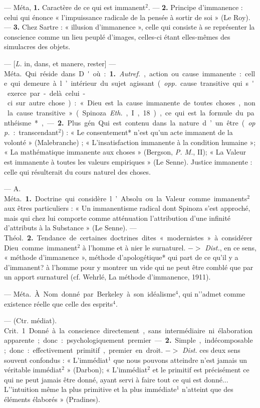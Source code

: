 \begin{itemize}[leftmargin=1cm, label=, itemsep=1pt]
 — Méta, {\bf 1.} Caractère de
ce qui est immanent$^2$. — {\bf 2.} Principe d'immanence : celui qui énonce
« l'impuissance radicale de la pensée
à sortir de soi » (Le Roy). — {\bf 3.} Chez
Sartre : « illusion d’immanence »,
celle qui consiste à se représenter la
conscience comme un lieu peuplé
d'images, celles-ci étant elles-mêmes
des simulacres des objets.

 — [{\it L.} in, dans, et manere,
rester] — \si{Méta.} Qui réside dans.
D'où : {\bf 1.} {\it Autref.}, action ou cause
immanente : celle qui demeure à
l’intérieur du sujet agissant ({\it opp.}
cause transitive qui s'exerce par-delà
celui-ci sur autre chose) : « Dieu
est la cause immanente de toutes
choses, non la cause transitive »
(Spinoza {\it Eth.}, I, 18), ce qui est la
formule du panthéisme*, — {\bf 2.}
Plus gén. Qui est contenu dans la
nature d’un être ({\it opp.} : transcendant$^2$) : « Le consentement* n'est
qu’un acte immanent de la volonté »
(Malebranche) ; « L’insatisfaction immanente à la condition humaine »;
« La mathématique immanente aux
choses » (Bergson, {\it P. M.}, II); « La
Valeur est immanente à toutes les
valeurs empiriques » (Le Senne).
Justice immanente : celle qui résulterait du cours naturel des choses.

 — A. \si{Méta.} {\bf 1.} Doctrine qui considère l’Absolu ou la
Valeur comme immanents$^2$ aux êtres
particuliers : « Un immanentisme
radical dont Spinoza s’est approché,
mais qui chez lui comporte comme
atténuation l'attribution d’une infinité d’attributs à la Substance »
(Le Senne). — \si{Théol.} {\bf 2.} Tendance
de certaines doctrines dites « modernistes » à considérer Dieu comme
immanent$^2$ à l’homme et à nier le
surnaturel. $->$ {\it Dist.}, en ce sens,
« méthode d’immanence », méthode
d’apologétique* qui part de ce qu'il
y a d’immanent? à l’homme pour y
montrer un vide qui ne peut être
comblé que par un apport surnaturel (cf. Wehrlé, La méthode d’immanence, 1911).

 — \si{Méta.} À. Nom
donné par Berkeley à son idéalisme$^4$, qui n'’admet comme existence réelle que celle des esprits$^4$.

 — (Ctr. médiat). \si{Crit.}
1. Donné à la conscience directement, sans intermédiaire ni élaboration apparente; donc : psychologiquement premier. — {\bf 2.} Simple,
indécomposable; donc : effectivement
primitif, premier en droit.
$->$ {\it Dist.} ces deux sens souvent
confondus : « L’immédiat$^1$ que nous
pouvons atteindre n’est jamais un
véritable immédiat$^2$ » (Darbon);
« L'immédiat$^2$ et le primitif est précisément ce qui ne peut jamais être
donné, ayant servi à faire tout ce
qui est donné... L'’intuition même
la plus primitive et la plus immédiate$^1$ n'atteint que des éléments
élaborés » (Pradines).


\end{itemize}
